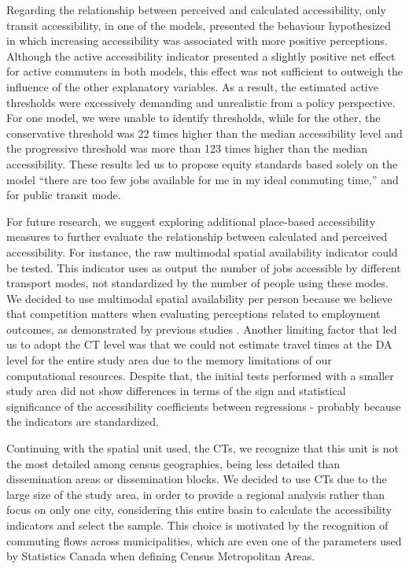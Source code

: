 \documentclass[preprint, 3p,
authoryear]{elsarticle} %
\begin{document}
Regarding the relationship between perceived and calculated
accessibility, only transit accessibility, in one of the models,
presented the behaviour hypothesized in which increasing accessibility
was associated with more positive perceptions. Although the active
accessibility indicator presented a slightly positive net effect for
active commuters in both models, this effect was not sufficient to
outweigh the influence of the other explanatory variables. As a result,
the estimated active thresholds were excessively demanding and
unrealistic from a policy perspective. For one model, we were unable to
identify thresholds, while for the other, the conservative threshold was
22 times higher than the median accessibility level and the progressive
threshold was more than 123 times higher than the median accessibility.
These results led us to propose equity standards based solely on the
model ``there are too few jobs available for me in my ideal commuting
time,'' and for public transit mode.

For future research, we suggest exploring additional place-based
accessibility measures to further evaluate the relationship between
calculated and perceived accessibility. For instance, the raw multimodal
spatial availability indicator could be tested. This indicator uses as
output the number of jobs accessible by different transport modes, not
standardized by the number of people using these modes. We decided to
use multimodal spatial availability per person because we believe that
competition matters when evaluating perceptions related to employment
outcomes, as demonstrated by previous studies
\citep{jin2018, merlin2017, miller2005}. Another limiting factor that
led us to adopt the CT level was that we could not estimate travel times
at the DA level for the entire study area due to the memory limitations
of our computational resources. Despite that, the initial tests
performed with a smaller study area did not show differences in terms of
the sign and statistical significance of the accessibility coefficients
between regressions - probably because the indicators are standardized.

Continuing with the spatial unit used, the CTs, we recognize that this
unit is not the most detailed among census geographies, being less
detailed than dissemination areas or dissemination blocks. We decided to
use CTs due to the large size of the study area, in order to provide a
regional analysis rather than focus on only one city, considering this
entire basin to calculate the accessibility indicators and select the
sample. This choice is motivated by the recognition of commuting flows
across municipalities, which are even one of the parameters used by
Statistics Canada when defining Census Metropolitan Areas.
\end{document}
